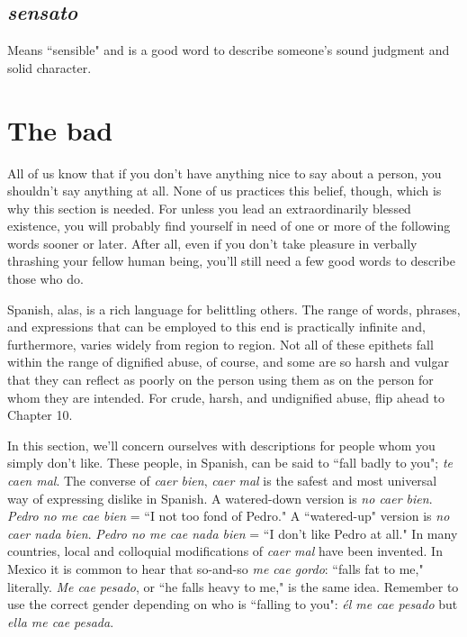 \subsection{\emph{sensato}}

Means ``sensible" and is a good word to describe
someone's sound judgment and solid character.

\section{The bad}

All of us know that if you don't have anything nice to say
about a person, you shouldn't say anything at all. None of us practices
this belief, though, which is why this section is needed. For unless you
lead an extraordinarily blessed existence, you will probably find yourself in need of one or more of the following words sooner or later. After
all, even if you don't take pleasure in verbally thrashing your fellow
human being, you'll still need a few good words to describe those
who do.

Spanish, alas, is a rich language for belittling others. The range
of words, phrases, and expressions that can be employed to this end is
practically infinite and, furthermore, varies widely from region to region. Not all of these epithets fall within the range of dignified abuse,
of course, and some are so harsh and vulgar that they can reflect as
poorly on the person using them as on the person for whom they are
intended. For crude, harsh, and undignified abuse, flip ahead to
Chapter 10.

In this section, we'll concern ourselves with descriptions for
people whom you simply don't like. These people, in Spanish, can be
said to ``fall badly to you"; \emph{te caen mal}. The converse of \emph{caer bien},
\emph{caer mal} is the safest and most universal way of expressing dislike in
Spanish. A watered-down version is \emph{no caer bien}. \emph{Pedro no me cae
bien} = ``I not too fond of Pedro." A ``watered-up" version is \emph{no caer
nada bien}. \emph{Pedro no me cae nada bien} = ``I don't like Pedro at all." In
many countries, local and colloquial modifications of \emph{caer mal} have
been invented. In Mexico it is common to hear that so-and-so \emph{me cae
gordo}: ``falls fat to me," literally. \emph{Me cae pesado}, or ``he falls heavy to
me," is the same idea. Remember to use the correct gender depending
on who is ``falling to you": \emph{él me cae pesado} but \emph{ella me cae pesada}.

